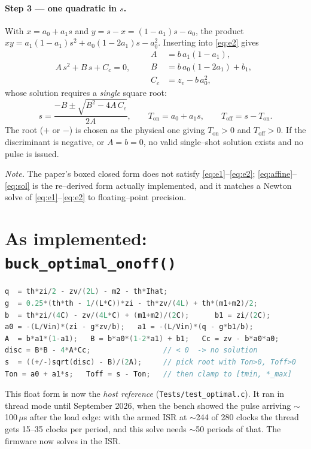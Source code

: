 \documentclass[11pt]{article}
\newcommand{\Ton}{T_{\mathrm{on}}}
\newcommand{\Toff}{T_{\mathrm{off}}}
\begin{document}
\paragraph{Step 3 --- one quadratic in $s$.}
With $x=a_0+a_1 s$ and $y=s-x=(1-a_1)s-a_0$, the product
$x y=a_1(1-a_1)s^2+a_0(1-2a_1)s-a_0^2$. Inserting into \eqref{eq:e2} gives
\begin{equation}
A\,s^2+B\,s+C_c=0,\qquad
\begin{aligned}
A&=b\,a_1(1-a_1),\\
B&=b\,a_0(1-2a_1)+b_1,\\
C_c&=z_v-b\,a_0^2,
\end{aligned}
\label{eq:quad}
\end{equation}
whose solution requires a \emph{single} square root:
\begin{equation}
s=\frac{-B\pm\sqrt{B^2-4A\,C_c}}{2A},\qquad
\Ton=a_0+a_1 s,\qquad \Toff=s-\Ton .
\label{eq:sol}
\end{equation}
The root ($+$ or $-$) is chosen as the physical one giving $\Ton>0$ and
$\Toff>0$. If the discriminant is negative, or $A=b=0$, no valid single--shot
solution exists and no pulse is issued.

\medskip
\noindent\textit{Note.} The paper's boxed closed form does not satisfy
\eqref{eq:e1}--\eqref{eq:e2}; \eqref{eq:affine}--\eqref{eq:sol} is the re--derived
form actually implemented, and it matches a Newton solve of
\eqref{eq:e1}--\eqref{eq:e2} to floating--point precision.

\section{As implemented: \texttt{buck\_optimal\_onoff()}}
\begin{lstlisting}[language=C]
q  = th*zi/2 - zv/(2L) - m2 - th*Ihat;
g  = 0.25*(th*th - 1/(L*C))*zi - th*zv/(4L) + th*(m1+m2)/2;
b  = th*zi/(4C) - zv/(4L*C) + (m1+m2)/(2C);      b1 = zi/(2C);
a0 = -(L/Vin)*(zi - g*zv/b);   a1 = -(L/Vin)*(q - g*b1/b);
A  = b*a1*(1-a1);   B = b*a0*(1-2*a1) + b1;   Cc = zv - b*a0*a0;
disc = B*B - 4*A*Cc;                 // < 0  -> no solution
s  = ((+/-)sqrt(disc) - B)/(2A);     // pick root with Ton>0, Toff>0
Ton = a0 + a1*s;   Toff = s - Ton;   // then clamp to [tmin, *_max]
\end{lstlisting}
This float form is now the \emph{host reference} (\texttt{Tests/test\_optimal.c}).
It ran in thread mode until September 2026, when the bench showed the pulse
arriving $\sim$100\,$\mu$s after the load edge: with the armed ISR at
$\sim$244 of 280 clocks the thread gets 15--35 clocks per period, and this
solve needs $\sim$50 periods of that. The firmware now solves in the ISR.
\end{document}
